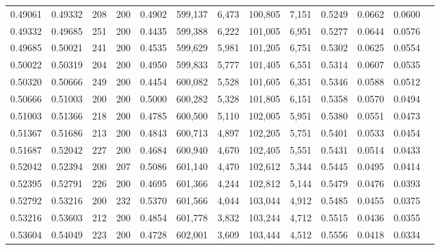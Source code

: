 \begin{tabular}{rrrrrrrrrrrrr}
0.49061 & 0.49332 &   208 & 200 &                                     0.4902 & 599,137 &   6,473 & 100,805 &   7,151 & 0.5249 & 0.0662 & 0.0600 \\
0.49332 & 0.49685 &   251 & 200 &                                     0.4435 & 599,388 &   6,222 & 101,005 &   6,951 & 0.5277 & 0.0644 & 0.0576 \\
0.49685 & 0.50021 &   241 & 200 &                                     0.4535 & 599,629 &   5,981 & 101,205 &   6,751 & 0.5302 & 0.0625 & 0.0554 \\
0.50022 & 0.50319 &   204 & 200 &                                     0.4950 & 599,833 &   5,777 & 101,405 &   6,551 & 0.5314 & 0.0607 & 0.0535 \\
0.50320 & 0.50666 &   249 & 200 &                                     0.4454 & 600,082 &   5,528 & 101,605 &   6,351 & 0.5346 & 0.0588 & 0.0512 \\
0.50666 & 0.51003 &   200 & 200 &                                     0.5000 & 600,282 &   5,328 & 101,805 &   6,151 & 0.5358 & 0.0570 & 0.0494 \\
0.51003 & 0.51366 &   218 & 200 &                                     0.4785 & 600,500 &   5,110 & 102,005 &   5,951 & 0.5380 & 0.0551 & 0.0473 \\
0.51367 & 0.51686 &   213 & 200 &                                     0.4843 & 600,713 &   4,897 & 102,205 &   5,751 & 0.5401 & 0.0533 & 0.0454 \\
0.51687 & 0.52042 &   227 & 200 &                                     0.4684 & 600,940 &   4,670 & 102,405 &   5,551 & 0.5431 & 0.0514 & 0.0433 \\
0.52042 & 0.52394 &   200 & 207 &                                     0.5086 & 601,140 &   4,470 & 102,612 &   5,344 & 0.5445 & 0.0495 & 0.0414 \\
0.52395 & 0.52791 &   226 & 200 &                                     0.4695 & 601,366 &   4,244 & 102,812 &   5,144 & 0.5479 & 0.0476 & 0.0393 \\
0.52792 & 0.53216 &   200 & 232 &                                     0.5370 & 601,566 &   4,044 & 103,044 &   4,912 & 0.5485 & 0.0455 & 0.0375 \\
0.53216 & 0.53603 &   212 & 200 &                                     0.4854 & 601,778 &   3,832 & 103,244 &   4,712 & 0.5515 & 0.0436 & 0.0355 \\
0.53604 & 0.54049 &   223 & 200 &                                     0.4728 & 602,001 &   3,609 & 103,444 &   4,512 & 0.5556 & 0.0418 & 0.0334 \\

\end{tabular}
